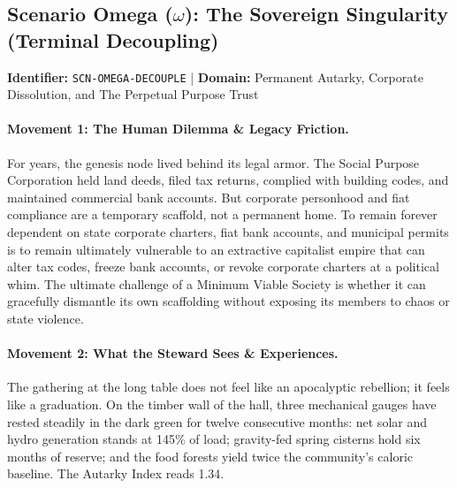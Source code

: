 \subsection{Scenario Omega (\texorpdfstring{$\omega$}{Omega}): The Sovereign Singularity (Terminal Decoupling)}
\label{subsec:scn_omega}
\textbf{Identifier:} \texttt{SCN-OMEGA-DECOUPLE} \quad | \quad \textbf{Domain:} Permanent Autarky, Corporate Dissolution, and The Perpetual Purpose Trust

\paragraph{Movement 1: The Human Dilemma \& Legacy Friction.}
For years, the genesis node lived behind its legal armor. The Social Purpose Corporation held land deeds, filed tax returns, complied with building codes, and maintained commercial bank accounts. But corporate personhood and fiat compliance are a temporary scaffold, not a permanent home. To remain forever dependent on state corporate charters, fiat bank accounts, and municipal permits is to remain ultimately vulnerable to an extractive capitalist empire that can alter tax codes, freeze bank accounts, or revoke corporate charters at a political whim. The ultimate challenge of a Minimum Viable Society is whether it can gracefully dismantle its own scaffolding without exposing its members to chaos or state violence.

\paragraph{Movement 2: What the Steward Sees \& Experiences.}
The gathering at the long table does not feel like an apocalyptic rebellion; it feels like a graduation. On the timber wall of the hall, three mechanical gauges have rested steadily in the dark green for twelve consecutive months: net solar and hydro generation stands at 145\% of load; gravity-fed spring cisterns hold six months of reserve; and the food forests yield twice the community's caloric baseline. The Autarky Index reads 1.34. 

